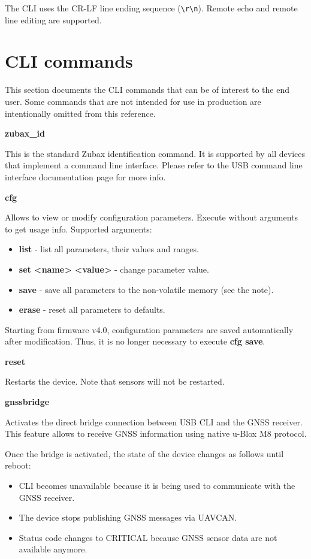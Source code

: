 \documentclass{zubaxdoc}
\begin{document}
The CLI uses the CR-LF line ending sequence (\verb|\r\n|).
Remote echo and remote line editing are supported.

\section{CLI commands}

This section documents the CLI commands that can be of interest to the end user.
Some commands that are not intended for use in production are intentionally omitted from this reference.

\textbf{zubax{\_}id}

This is the standard Zubax identification command. It is supported by all devices that implement a command line interface. Please refer to the USB command line interface documentation page for more info.

\textbf{cfg}

Allows to view or modify configuration parameters.
Execute without arguments to get usage info. Supported arguments:
\begin{itemize}
\item \textbf{list} - list all parameters, their values and ranges.
\item \textbf{set <name> <value>} - change parameter value.
\item \textbf{save} - save all parameters to the non-volatile memory (see the note).
\item \textbf{erase} - reset all parameters to defaults.
\end{itemize}

Starting from firmware v4.0, configuration parameters are saved automatically after modification. Thus, it is no longer necessary to execute \textbf{cfg save}.

\textbf{reset}

Restarts the device. Note that sensors will not be restarted.

\textbf{gnssbridge}

Activates the direct bridge connection between USB CLI and the GNSS receiver. This feature allows to receive GNSS information using native u-Blox M8 protocol.

Once the bridge is activated, the state of the device changes as follows until reboot:
\begin{itemize}
\item CLI becomes unavailable because it is being used to communicate with the GNSS receiver.
\item The device stops publishing GNSS messages via UAVCAN.
\item Status code changes to CRITICAL because GNSS sensor data are not available anymore.
\end{itemize}
\end{document}
